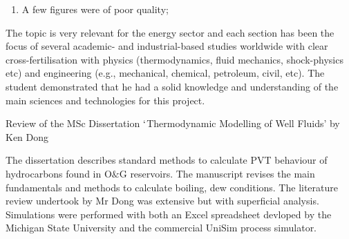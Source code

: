 \documentclass[14pt,twoside]{report}
\begin{document}
\begin{enumerate}
%
\item A few figures were of poor quality;
%
\end{enumerate}
The topic is very relevant for the energy sector and each section has been the focus of several academic- and industrial-based studies worldwide with clear cross-fertilisation with physics (thermodynamics, fluid mechanics, shock-physics etc) and engineering (e.g., mechanical, chemical, petroleum, civil, etc). The student demonstrated that he had a solid knowledge and understanding of the main sciences and technologies for this project.


\clearpage


\bigskip

\begin{center}
{\Large Review of the MSc Dissertation $\lq$Thermodynamic Modelling of Well Fluids' by Ken Dong}
\end{center}

\medskip

The dissertation describes standard methods to calculate PVT behaviour of hydrocarbons found in O$\&$G reservoirs. The manuscript revises the main fundamentals and methods to calculate boiling, dew conditions. The literature review undertook by Mr Dong was extensive but with superficial analysis. Simulations were performed with both an Excel spreadsheet devloped by the Michigan State University and the commercial UniSim process simulator.
\end{document}
